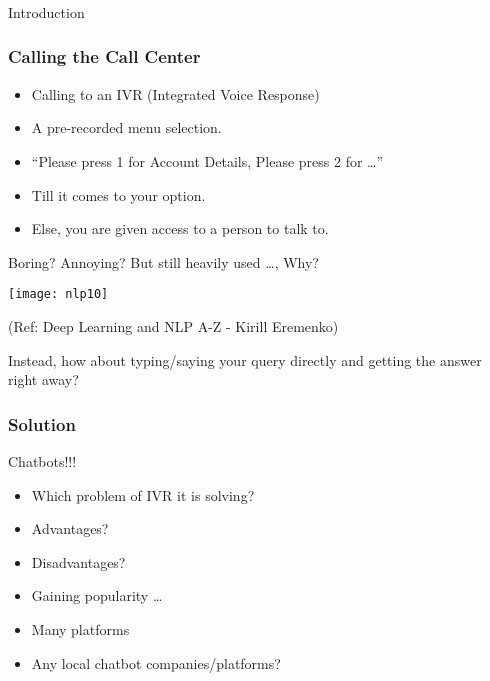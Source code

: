 \begin{frame}[fragile]\frametitle{}
\begin{center}
{\Large Introduction}
\end{center}
\end{frame}


\begin{frame}[fragile]\frametitle{Calling the Call Center}
	\begin{itemize}
	\item Calling to an IVR (Integrated Voice Response)
	\item A pre-recorded menu selection.
	\item ``Please press 1 for Account Details, Please press 2 for \ldots''
	\item Till it comes to your option. 
	\item Else, you are given access to a person to talk to.
	\end{itemize}

Boring? Annoying? But still heavily used \ldots, Why?

\begin{center}
\texttt{[image: nlp10]}

\tiny{(Ref: Deep Learning and NLP A-Z - Kirill Eremenko)}
\end{center}
Instead, how about typing/saying your query directly and getting the answer right away?

\end{frame}

\begin{frame}[fragile]\frametitle{Solution}
Chatbots!!!

	\begin{itemize}
	\item Which problem of IVR it is solving?
	\item Advantages?
	\item Disadvantages?
	\item Gaining popularity \ldots
	\item Many platforms
	\item Any local chatbot companies/platforms?
	\end{itemize}


\end{frame}

